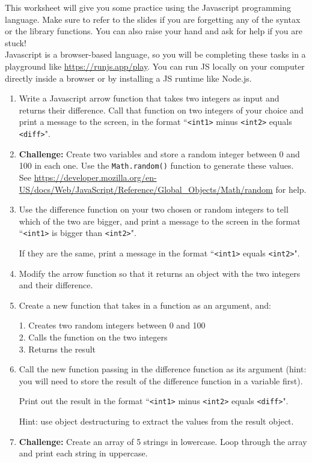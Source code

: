 \documentclass{./worksheet}
\begin{document}
This worksheet will give you some practice using the Javascript programming language. Make sure to refer to the slides if you are forgetting
any of the syntax or the library functions. You can also raise your hand and ask for help if you are stuck! \\

Javascript is a browser-based language, so you will be completing these tasks in
a playground like \url{https://runjs.app/play}. You can run JS locally on your computer
directly inside a browser or by installing a JS runtime like Node.js.
\begin{enumerate}

\item Write a Javascript arrow function that takes two integers as input and returns their difference.
Call that function on two integers of your choice and print a message to the screen,
in the format ``\verb|<int1>| minus \verb|<int2>| equals \verb|<diff>|".

\item \textbf{Challenge:} Create two variables and store a random integer between 0 and 100 in each one.
Use the \verb|Math.random()| function to generate these values. See \url{https://developer.mozilla.org/en-US/docs/Web/JavaScript/Reference/Global_Objects/Math/random}
for help.

\item Use the difference function on your two chosen or random integers to tell which of the two are bigger,
and print a message to the screen in the format ``\verb|<int1>| is bigger than \verb|<int2>|".

If they are the same, print a message in the format ``\verb|<int1>| equals \verb|<int2>|".

\item Modify the arrow function so that it returns an object with the two integers and their difference.

\item Create a new function that takes in a function as an argument, and:

1. Creates two random integers between 0 and 100 \\
2. Calls the function on the two integers \\
3. Returns the result

\item Call the new function passing in the difference function as its argument
(hint: you will need to store the result of the difference function in a variable first).

Print out the result in the format ``\verb|<int1>| minus \verb|<int2>| equals \verb|<diff>|".

Hint: use object destructuring to extract the values from the result object.

\item \textbf{Challenge:} Create an array of 5 strings in lowercase. Loop through the array
and print each string in uppercase.


\end{enumerate}
\end{document}
